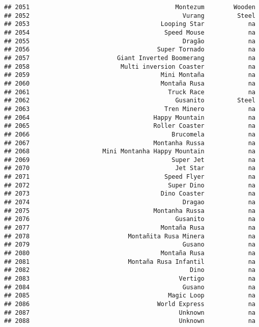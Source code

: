 \documentclass[
]{article}
\begin{document}
\begin{verbatim}
## 2051                                        Montezum        Wooden
## 2052                                          Vurang         Steel
## 2053                                    Looping Star            na
## 2054                                     Speed Mouse            na
## 2055                                          Dragão            na
## 2056                                   Super Tornado            na
## 2057                        Giant Inverted Boomerang            na
## 2058                         Multi inversion Coaster            na
## 2059                                    Mini Montaña            na
## 2060                                    Montaña Rusa            na
## 2061                                      Truck Race            na
## 2062                                        Gusanito         Steel
## 2063                                     Tren Minero            na
## 2064                                  Happy Mountain            na
## 2065                                  Roller Coaster            na
## 2066                                       Brucomela            na
## 2067                                  Montanha Russa            na
## 2068                    Mini Montanha Happy Mountain            na
## 2069                                       Super Jet            na
## 2070                                        Jet Star            na
## 2071                                     Speed Flyer            na
## 2072                                      Super Dino            na
## 2073                                    Dino Coaster            na
## 2074                                          Dragao            na
## 2075                                  Montanha Russa            na
## 2076                                        Gusanito            na
## 2077                                    Montaña Rusa            na
## 2078                           Montañita Rusa Minera            na
## 2079                                          Gusano            na
## 2080                                    Montaña Rusa            na
## 2081                           Montaña Rusa Infantil            na
## 2082                                            Dino            na
## 2083                                         Vertigo            na
## 2084                                          Gusano            na
## 2085                                      Magic Loop            na
## 2086                                   World Express            na
## 2087                                         Unknown            na
## 2088                                         Unknown            na

\end{verbatim}
\end{document}
